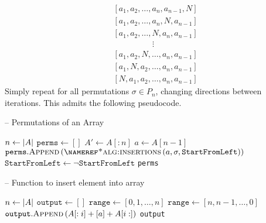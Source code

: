 \documentclass[final]{article}
\begin{document}
\begin{align*}
     & [a_1, a_2, \dots, a_n, a_{n-1}, N]  \\
     & [a_1, a_2, \dots, a_n, N, a_{n-1}]  \\
     & [a_1, a_2, \dots, N, a_n, a_{n-1}]  \\
     & \phantom{.................}  \vdots \\
     & [a_1, a_2, N, \dots, a_n, a_{n-1}]  \\
     & [a_1, N, a_2, \dots, a_n, a_{n-1}]  \\
     & [N, a_1, a_2, \dots, a_n, a_{n-1}]
\end{align*}
Simply repeat for all permutations $\sigma\in P_n$, changing directions between iterations. This admits the following pseudocode.
\begin{algorithm}[H]
    \caption[]{ -- Permutations of an Array }
    \label{alg:permutations}
    \begin{algorithmic}[1]
        \State $n\gets\left\lvert A\right\rvert$
        \Else {}
        \State $\texttt{perms} \gets []$
        \State $A' \gets A[:n]$ \label{line:permsubarr}
        \State $a \gets A[n - 1]$
         \label{line:permreccall}
        \State $\texttt{perms}.\Call{Append}{\Call{\nameref*{alg:insertions}}{a, \sigma, \texttt{StartFromLeft}}}$
        \State $\texttt{StartFromLeft} \gets \neg \texttt{StartFromLeft}$
        \EndFor
        \State \Return \texttt{perms}
        \EndIf
        \EndFunction
    \end{algorithmic}
\end{algorithm}
\begin{algorithm}[H]
    \caption[]{ -- Function to insert element into array}
    \label{alg:insertions}
    \begin{algorithmic}[1]
        \State $n\gets\left\lvert A\right\rvert$
        \State $\texttt{output} \gets []$
        \State $\texttt{range} \gets [0, 1, \dots, n]$
        \Else
        \State $\texttt{range} \gets [n, n-1, \dots, 0]$
        \EndIf
        \State $\texttt{output}.\Call{Append}{A[:i] + [a] + A[i:]}$ \label{line:insertappend}
        \EndFor
        \State \Return \texttt{output}
        \EndFunction
    \end{algorithmic}
\end{algorithm}
\end{document}
